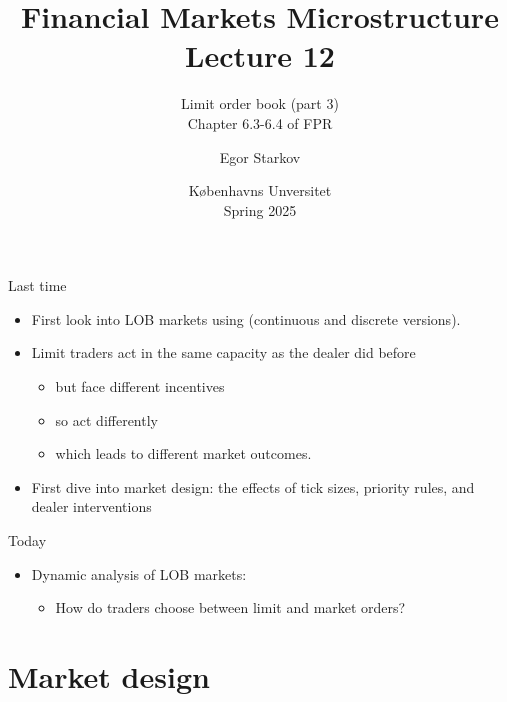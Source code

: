 \documentclass[english,10pt
,aspectratio=169
]{beamer}
\title{Financial Markets Microstructure \\ Lecture 12}
\subtitle{Limit order book (part 3)\\
	Chapter 6.3-6.4 of FPR}
\author{Egor Starkov}
\date{K{\o}benhavns Unversitet \\
	Spring 2025}
\begin{document}
\frame[plain]{\titlepage}


\begin{frame}{Last time}
	\begin{itemize}
		\item First look into LOB markets using \cite{glosten_is_1994} (continuous and discrete versions).
		\item Limit traders act in the same capacity as the dealer did before
		\begin{itemize}
			\item but face different incentives
			\item so act differently
			\item which leads to different market outcomes.
		\end{itemize}
		\item First dive into market design: the effects of tick sizes, priority rules, and dealer interventions
	\end{itemize}
\end{frame}


\begin{frame}{Today}
	\begin{itemize}
		\item Dynamic analysis of LOB markets:
		\begin{itemize}
			\item How do traders choose between limit and market orders?
		\end{itemize}
	\end{itemize}
\end{frame}







\section{Market design}
\end{document}
